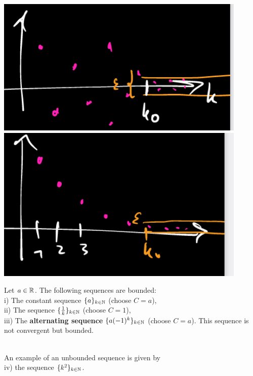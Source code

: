 \begin{frame}
\begin{defi}
\begin{minipage}[t]{0.3\textwidth}
 \includegraphics[width=0.9\textwidth]{./media/sequence-cauchy}
 	\includegraphics[width=0.9\textwidth]{./media/sequence-null}
\end{minipage}

\end{defi}
\end{frame}
%
\begin{frame}
\begin{ex}
	\blank 
	Let $a\in{\mathbb{R}}$. The following sequences are bounded:\\


		i) The constant sequence $\{a\}_{k\in{\mathbb{N}}}$ (choose $C = a$), \\
		
		ii) The sequence $\{\frac{1}{k}\}_{k\in{\mathbb{N}}}$ (choose $C = 1$),\\
		
		iii) The \textbf{alternating sequence} $\{a (-1)^k\}_{k\in{\mathbb{N}}}$ (choose $C=a$). This sequence is not convergent but bounded.

~\\
	An example of an unbounded sequence is given by\\
	
	iv) the sequence $\{k^2\}_{k\in{\mathbb{N}}}$. \\~\\
\end{ex}
\end{frame}


